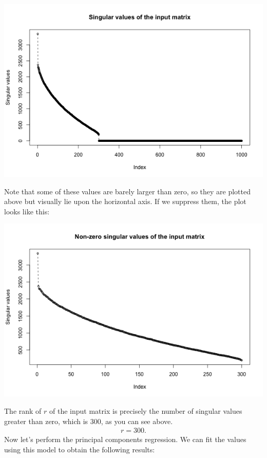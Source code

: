 \documentclass[a4paper, 11pt]{article}
\begin{document}
\begin{center}
\includegraphics[scale=0.7]{ps1_plot4.png}
\end{center}
Note that some of these values are barely larger than zero, so they are plotted above but visually lie upon the horizontal axis. If we suppress them, the plot looks like this:
\begin{center}
\includegraphics[scale=0.7]{ps1_plot5.png}
\end{center}
The rank of $r$ of the input matrix is precisely the number of singular values greater than zero, which is 300, as you can see above.
\begin{eqnarray}
r = 300. \nonumber
\end{eqnarray}
Now let's perform the principal components regression. We can fit the values using this model to obtain the following results:
\end{document}
